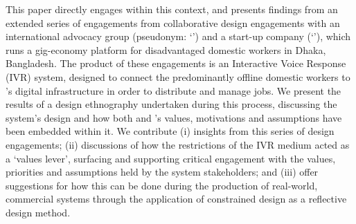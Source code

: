 This paper directly engages within this context, and presents findings from an extended series of engagements from collaborative design engagements with an international advocacy group (pseudonym: `\NGO{}') and a start-up company (`\PC{}'), which runs a gig-economy platform for disadvantaged domestic workers in Dhaka, Bangladesh. The product of these engagements is an Interactive Voice Response (IVR) system, designed to connect the predominantly offline domestic workers to \PC{}'s digital infrastructure in order to distribute and manage jobs. We present the results of a design ethnography undertaken during this process, discussing the system's design and how both \NGO{} and \PC{}'s values, motivations and assumptions have been embedded within it. We contribute (i) insights from this series of design engagements; (ii) discussions of how the restrictions of the IVR medium acted as a `values lever', surfacing and supporting critical engagement with the values, priorities and assumptions held by the system stakeholders; and (iii) offer suggestions for how this can be done during the production of real-world, commercial systems through the application of constrained design as a reflective design method.


